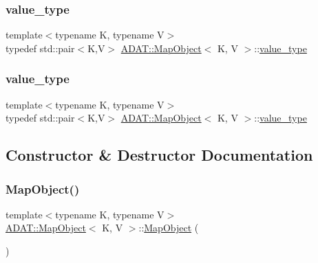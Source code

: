 \subsubsection{\texorpdfstring{value\_type}{value\_type}\hspace{0.1cm}{\footnotesize\ttfamily [1/2]}}
{\footnotesize\ttfamily template$<$typename K, typename V$>$ \\
typedef std\+::pair$<$K,V$>$ \mbox{\hyperlink{classADAT_1_1MapObject}{A\+D\+A\+T\+::\+Map\+Object}}$<$ K, V $>$\+::\mbox{\hyperlink{classADAT_1_1MapObject_ad985e6ff5b35a72c79d4b466d316cc0a}{value\+\_\+type}}}

\mbox{\label{classADAT_1_1MapObject_ad985e6ff5b35a72c79d4b466d316cc0a}} 
\subsubsection{\texorpdfstring{value\_type}{value\_type}\hspace{0.1cm}{\footnotesize\ttfamily [2/2]}}
{\footnotesize\ttfamily template$<$typename K, typename V$>$ \\
typedef std\+::pair$<$K,V$>$ \mbox{\hyperlink{classADAT_1_1MapObject}{A\+D\+A\+T\+::\+Map\+Object}}$<$ K, V $>$\+::\mbox{\hyperlink{classADAT_1_1MapObject_ad985e6ff5b35a72c79d4b466d316cc0a}{value\+\_\+type}}}



\subsection{Constructor \& Destructor Documentation}
\mbox{\label{classADAT_1_1MapObject_a27943eb119ceceef215cf8d638da096e}} 
\subsubsection{\texorpdfstring{MapObject()}{MapObject()}\hspace{0.1cm}{\footnotesize\ttfamily [1/2]}}
{\footnotesize\ttfamily template$<$typename K, typename V$>$ \\
\mbox{\hyperlink{classADAT_1_1MapObject}{A\+D\+A\+T\+::\+Map\+Object}}$<$ K, V $>$\+::\mbox{\hyperlink{classADAT_1_1MapObject}{Map\+Object}} (\begin{DoxyParamCaption}{ }\end{DoxyParamCaption})\hspace{0.3cm}{\ttfamily [inline]}}




